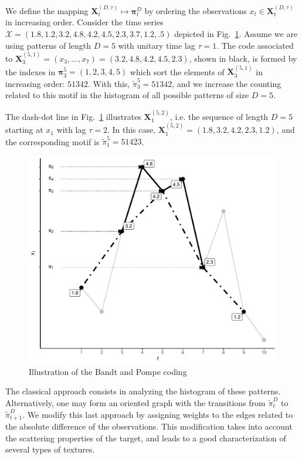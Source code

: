 \documentclass{isprs}
\begin{document}
We define the mapping ${\mathbf X}_t^{(D,\tau)} \mapsto {\mathbf \pi}_t^{D}$ by ordering the observations $x_t \in {\mathbf X}_t^{(D,\tau)}$ in increasing order.
Consider the time series $\mathcal X = (1.8, 1.2, 3.2, 4.8, 4.2, 4.5, 2.3, 3.7, 1.2, .5)$ depicted in Fig.~\ref{Fig:IntroBP}.
Assume we are using patterns of length $D=5$ with unitary time lag $\tau=1$.
The code associated to $\mathbf X_{3}^{(5,1)}=(x_3,\dots,x_7)=(3.2, 4.8, 4.2, 4.5, 2.3)$, shown in black, is formed by the indexes in $\bm\pi_3^{5}=(1,2,3,4,5)$ which sort the elements of $\mathbf X_{3}^{(5,1)}$ in increasing order: $51342$.
With this, $\widetilde{\pi}_3^{5} = 51342$, and we increase the counting related to this motif in the histogram of all possible patterns of size $D=5$.

The dash-dot line in Fig.~\ref{Fig:IntroBP} illustrates $\mathbf X_{1}^{(5,2)}$, i.e. the sequence of length $D=5$ starting at $x_1$ with lag $\tau=2$.
In this case, $\mathbf X_{1}^{(5,2)}= (1.8, 3.2, 4.2, 2.3, 1.2)$, and the corresponding motif is $\widetilde{\pi}_1^{5}=51423$.

\begin{figure}[hbt]
	\centering
	\includegraphics[width=.9\linewidth]{../../Figures/IntroBP}
	\caption{Illustration of the Bandt and Pompe coding\label{Fig:IntroBP}}
\end{figure}


The classical approach consists in analyzing the histogram of these patterns.
Alternatively, one may form an oriented graph with the transitions from $\widetilde\pi_t^D$ to $\widetilde\pi_{t+1}^D$.
We modify this last approach by assigning weights to the edges related to the absolute difference of the observations.
This modification takes into account the scattering properties of the target, and leads to a good characterization of several types of textures.
\end{document}
